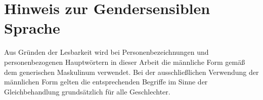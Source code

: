 \section*{Hinweis zur Gendersensiblen Sprache}

	Aus Gründen der Lesbarkeit wird bei Personenbezeichnungen und personenbezogenen Hauptwörtern in dieser Arbeit die männliche Form gemäß dem generischen Maskulinum verwendet. Bei der ausschließlichen Verwendung der männlichen Form gelten die entsprechenden Begriffe im Sinne der Gleichbehandlung grundsätzlich für alle Geschlechter.